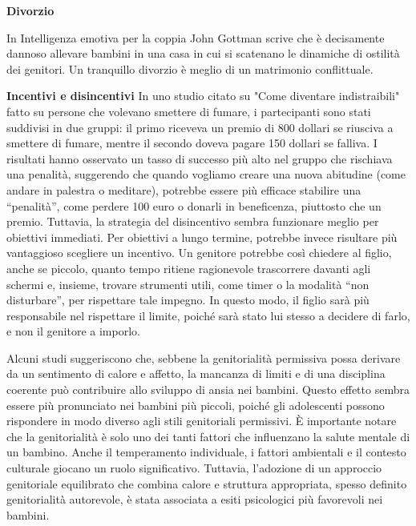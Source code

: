 \documentclass[12pt]{book} %
\begin{document}
\textbf{Divorzio}

In Intelligenza emotiva per la coppia John Gottman scrive che è
decisamente dannoso allevare bambini in una casa in cui si scatenano le dinamiche di ostilità dei genitori. Un
tranquillo divorzio è meglio di un matrimonio conflittuale. 

\textbf{Incentivi e disincentivi}
In uno studio citato su "Come diventare indistraibili" fatto su persone che volevano smettere di fumare, i partecipanti sono stati suddivisi in due gruppi: il primo riceveva un premio di 800 dollari se riusciva a smettere di fumare, mentre il secondo doveva pagare 150 dollari se falliva. I risultati hanno osservato un tasso di successo più alto nel gruppo che rischiava una penalità, suggerendo che quando vogliamo creare una nuova abitudine (come andare in palestra o meditare), potrebbe essere più efficace stabilire una “penalità”, come perdere 100 euro o donarli in beneficenza, piuttosto che un premio. Tuttavia, la strategia del disincentivo sembra funzionare meglio per obiettivi immediati. Per obiettivi a lungo termine, potrebbe invece risultare più vantaggioso scegliere un incentivo.
Un genitore potrebbe così chiedere al figlio, anche se piccolo, quanto tempo ritiene ragionevole trascorrere davanti agli schermi e, insieme, trovare strumenti utili, come timer o la modalità “non disturbare”, per rispettare tale impegno. In questo modo, il figlio sarà più responsabile nel rispettare il limite, poiché sarà stato lui stesso a decidere di farlo, e non il genitore a imporlo.

Alcuni studi   suggeriscono che, sebbene la genitorialità permissiva possa derivare da un sentimento di calore e affetto, la mancanza di limiti e di una disciplina coerente può contribuire allo sviluppo di ansia nei bambini. Questo effetto sembra essere più pronunciato nei bambini più piccoli, poiché gli adolescenti possono rispondere in modo diverso agli stili genitoriali permissivi. È importante notare che la genitorialità è solo uno dei tanti fattori che influenzano la salute mentale di un bambino. Anche il temperamento individuale, i fattori ambientali e il contesto culturale giocano un ruolo significativo. Tuttavia, l'adozione di un approccio genitoriale equilibrato che combina calore e struttura appropriata, spesso definito genitorialità autorevole, è stata associata a esiti psicologici più favorevoli nei bambini.
\end{document}
